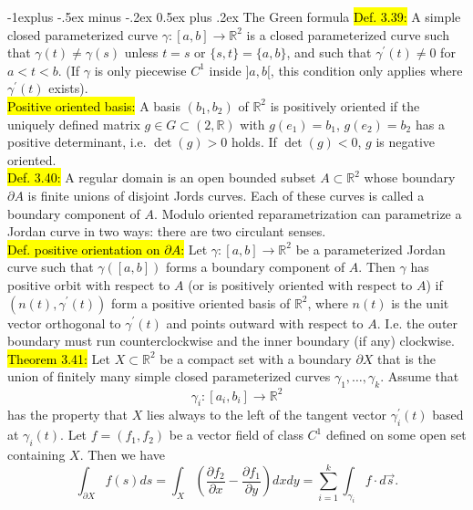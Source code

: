 \documentclass[10pt,landscape]{article}
\makeatletter
\newcommand{\green}[1]{\sethlcolor{green}\hl{#1}}
\newcommand{\blue}[1]{\sethlcolor{cyan} \hl{#1}}
\renewcommand{\subsection}{\@startsection{subsection}{2}{0mm}%
                                {-1explus -.5ex minus -.2ex}%
                                {0.5ex plus .2ex}%
                                {\normalfont\normalsize\bfseries}}
\makeatother
\begin{document}
\begin{multicols}{3}
\subsection{The Green formula}
\blue{Def. 3.39:} A simple closed parameterized curve $\gamma:[a, b] \rightarrow \mathbb{R}^{2}$ is a closed parameterized curve such that 
$\gamma(t) \neq \gamma(s)$ unless $t=s$ or $\{s, t\}=\{a, b\}$, and such that $\gamma^{\prime}(t) \neq 0$ for $a<t<b$. (If $\gamma$ is only piecewise $C^{1}$ inside $] a, b[$, 
this condition only applies where $\gamma^{\prime}(t)$ exists).\\
\blue{Positive oriented basis:} A basis $(b_1, b_2)$ of $\mathbb{R}^2$ is positively oriented if the uniquely defined matrix $g \in G \subset (2, \mathbb{R})$ with $g(e_1) = b_1$,
$g(e_2) = b_2$ has a positive determinant, i.e. $\det(g) > 0$ holds. If $\det(g) < 0$, $g$ is negative oriented.\\
\blue{Def. 3.40:}  
A regular domain is an open bounded subset $A \subset \mathbb{R}^2$ whose boundary $\partial A$ is finite unions of disjoint Jords curves. 
Each of these curves is called a boundary component of $A$. Modulo oriented reparametrization can parametrize a Jordan curve in two ways: there are two circulant senses.\\
\blue{Def. positive orientation on $\partial A$:} 
Let $\gamma: [a,b] \rightarrow \mathbb{R}^2$ be a parameterized Jordan curve such that $\gamma([a,b])$ forms a boundary component of $A$. Then $\gamma$ has positive orbit with respect to $A$ 
(or is positively oriented with respect to $A$) if $(n(t),\gamma^{\prime}(t))$ form a positive oriented basis of $\mathbb{R}^2$, where $n(t)$ is the unit vector orthogonal to $\gamma^{\prime}(t)$ 
and points outward with respect to $A$. I.e. the outer boundary must run counterclockwise and the inner boundary (if any) clockwise.\\
\green{Theorem 3.41:} Let $X \subset \mathbb{R}^{2}$ be a compact set with a boundary $\partial X$ that is the union of finitely many simple closed parameterized curves $\gamma_{1}, \ldots, \gamma_{k}$. Assume that
$$
\gamma_{i}:\left[a_{i}, b_{i}\right] \rightarrow \mathbb{R}^{2}
$$
has the property that $X$ lies always \glqq to the left\grqq{} of the tangent vector $\gamma_{i}^{\prime}(t)$ based at $\gamma_{i}(t)$. Let $f=\left(f_{1}, f_{2}\right)$ be a vector field of class $C^{1}$ defined on some open set containing $X$. Then we have
$$
\int_{\partial X}f(s)ds = \int_{X}\left(\frac{\partial f_{2}}{\partial x}-\frac{\partial f_{1}}{\partial y}\right) d x d y=\sum_{i=1}^{k} \int_{\gamma_{i}} f \cdot d \vec{s} .
$$
\end{multicols}
\end{document}
